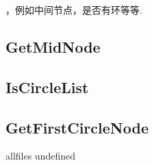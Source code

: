 \documentclass{article}
\begin{document}
\begin{CJK}{UTF8}{gbsn}     %

\else
    
，例如中间节点，是否有环等等.
\subsection{GetMidNode}

\subsection{IsCircleList}

\subsection{GetFirstCircleNode}


\fi

\ifx allfiles undefined
\end{CJK}
\end{document}
